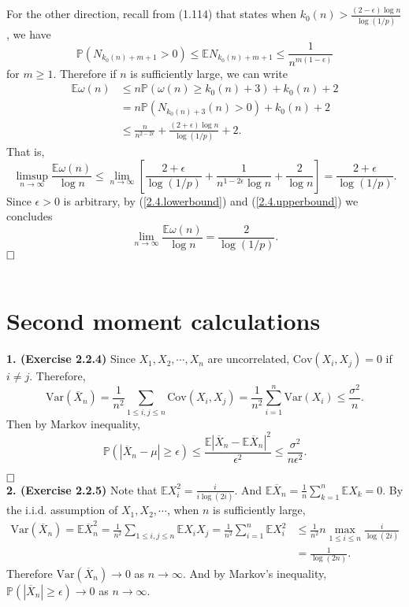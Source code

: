 \documentclass[12pt]{extarticle}
\begin{document}
For the other direction, recall from (1.114) that states when $k_0(n)>\frac{(2-\epsilon)\log n}{\log(1/p)}$, we have
\[
\mathbb{P}\left(N_{k_0(n)+m+1}>0\right)\leq\mathbb{E}N_{k_0(n)+m+1}\leq\frac{1}{n^{m(1-\epsilon)}}
\]
for $m\geq 1$. Therefore if $n$ is sufficiently large, we can write
\[
\begin{aligned}
\mathbb{E}\omega(n) &\leq n\mathbb{P}\left(\omega(n)\geq k_0(n)+3\right)+k_0(n)+2
\\&
=n\mathbb{P}\left(N_{k_0(n)+3}(n)>0\right)+k_0(n)+2
\\&
\leq \frac{n}{n^{2-2\epsilon}}+\frac{(2+\epsilon)\log n}{\log(1/p)}+2.
\end{aligned}
\]
That is, 
\begin{equation}
\limsup_{n\rightarrow\infty}\frac{\mathbb{E}\omega(n)}{\log n}
\leq
\lim_{n\rightarrow\infty}
\left[
\frac{	2+\epsilon}{\log(1/p)}+\frac{1}{n^{1-2\epsilon}\log n}+\frac{2}{\log n}
\right]
=
\frac{2+\epsilon}{\log(1/p
)}.
\label{2.4.upperbound}
\end{equation}
Since $\epsilon>0$ is arbitrary, by (\ref{2.4.lowerbound}) and (\ref{2.4.upperbound}) we concludes
\[
\lim_{n\rightarrow\infty}\frac{\mathbb{E}\omega(n)}{\log n}=\frac{2}{\log(1/p)}.
\]
$\hspace{\fill}\square$
\\
\\
\newpage
\section*{Second moment calculations}
\textbf{1. (Exercise 2.2.4)}
Since $X_1,X_2,\cdots,X_n$ are uncorrelated, $\text{Cov}(X_i,X_j)=0$ if $i\neq j$.
Therefore,
\[
\text{Var}(\overline{X}_n)=\frac{1}{n^2}\sum_{1\leq i,j\leq n}\text{Cov}(X_i,X_j)=\frac{1}{n^2}\sum_{i=1}^n\text{Var}(X_i)\leq\frac{\sigma^2}{n}.
\]
Then by Markov inequality,
\[
\mathbb{P}(|\overline{X}_n-\mu|\geq\epsilon)\leq\frac{\mathbb{E}|\overline{X}_n-\mathbb{E}\overline{X}_n|^2}{\epsilon^2}\leq\frac{\sigma^2}{n\epsilon^2}.
\]

$\hspace{\fill}\square$
\\
\textbf{2. (Exercise 2.2.5)}
Note that $\mathbb{E}X_i^2=\frac{i}{i\log(2i)}$. And
$
\mathbb{E}\overline{X}_n=\frac{1}{n}\sum_{k=1}^n\mathbb{E}X_k=0
$.
By the i.i.d. assumption of $X_1,X_2,\cdots$, when $n$ is sufficiently large,
\[
\begin{aligned}
\text{Var}(\overline{X}_n)=\mathbb{E}\overline{X}_n^2=\frac{1}{n^2}\sum_{1\leq i,j\leq n}\mathbb{E}X_iX_j
=
\frac{1}{n^2}\sum_{i=1}^n\mathbb{E}X_i^2
&\leq
\frac{1}{n^2}n\max_{1\leq i\leq n}\frac{i}{\log(2i)}
\\&=
\frac{1}{\log(2n)}.
\end{aligned}
\]
Therefore $\text{Var}(\overline{X}_n)\rightarrow 0$ as $n\rightarrow\infty$.
And by Markov's inequality,
$\mathbb{P}(|\overline{X}_n|\geq\epsilon)\rightarrow 0$ as $n\rightarrow\infty$.
\end{document}

